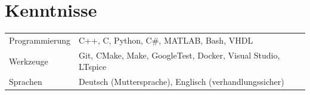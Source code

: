 \documentclass[a4paper,10pt]{article}
\newlength{\datecol}\setlength{\datecol}{3.8cm}
\begin{document}
\section{Kenntnisse}

\begin{tabularx}{\textwidth}{@{}p{\datecol}@{}X@{}}
    \textcolor{muted}{Programmierung} & C++, C, Python, C\#, MATLAB, Bash, VHDL \\[0.15em]
    \textcolor{muted}{Werkzeuge}      & Git, CMake, Make, GoogleTest, Docker, Visual Studio, LTspice \\[0.15em]
    \textcolor{muted}{Sprachen}       & Deutsch (Muttersprache), Englisch (verhandlungssicher) \\
\end{tabularx}

\vfill
\end{document}
